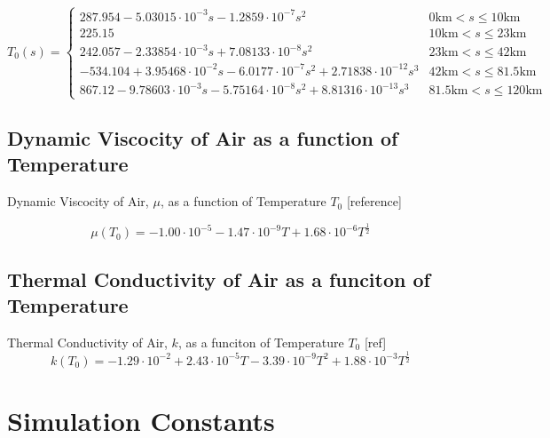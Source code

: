 \documentclass[twocolumn]{article}
\begin{document}
\begin{appendices}
                \[T_0(s)=\begin{cases}
                    287.954-5.03015\cdot10^{-3}s-1.2859\cdot10^{-7}s^2 & 0\textrm{km}<s\leq 10\textrm{km}\\
                    225.15 & 10\textrm{km}<s\leq 23\textrm{km}\\
                    242.057-2.33854\cdot10^{-3}s+7.08133\cdot10^{-8}s^2 & 23\textrm{km}<s\leq 42\textrm{km}\\
                    -534.104+3.95468\cdot10^{-2}s-6.0177\cdot10^{-7}s^2+2.71838\cdot10^{-12}s^3 & 42\textrm{km}<s\leq 81.5\textrm{km}\\
                    867.12-9.78603\cdot10^{-3}s-5.75164\cdot10^{-8}s^2+8.81316\cdot10^{-13}s^3 &  81.5\textrm{km}<s\leq 120\textrm{km}
                \end{cases}\]
            \subsection{Dynamic Viscocity of Air as a function of Temperature}
                Dynamic Viscocity of Air, $\mu$, as a function of Temperature $T_0$ [reference]
                
                \[\mu(T_0)=-1.00\cdot10^{-5}-1.47\cdot10^{-9}T+1.68\cdot10^{-6}T^{\frac{1}{2}}\]

            \subsection{Thermal Conductivity of Air as a funciton of Temperature}
                Thermal Conductivity of Air, $k$, as a funciton of Temperature $T_0$ [ref]
                \[k(T_0)=-1.29\cdot10^{-2}+2.43\cdot10^{-5}T-3.39\cdot10^{-9}T^2+1.88\cdot10^{-3}T^{\frac{1}{2}}\]

        \section{Simulation Constants}
        \label{appendix:b}
    \end{appendices}
\end{document}
